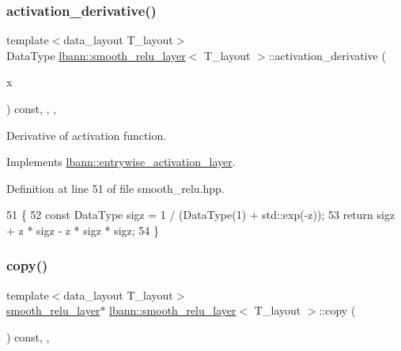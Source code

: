 \subsubsection{\texorpdfstring{activation\+\_\+derivative()}{activation\_derivative()}}
{\footnotesize\ttfamily template$<$data\+\_\+layout T\+\_\+layout$>$ \\
Data\+Type \hyperlink{classlbann_1_1smooth__relu__layer}{lbann\+::smooth\+\_\+relu\+\_\+layer}$<$ T\+\_\+layout $>$\+::activation\+\_\+derivative (\begin{DoxyParamCaption}\item[{Data\+Type}]{x }\end{DoxyParamCaption}) const\hspace{0.3cm}{\ttfamily [inline]}, {\ttfamily [override]}, {\ttfamily [protected]}, {\ttfamily [virtual]}}

Derivative of activation function. 

Implements \hyperlink{classlbann_1_1entrywise__activation__layer_a7676a4c5060452a38264993554e79f8e}{lbann\+::entrywise\+\_\+activation\+\_\+layer}.



Definition at line 51 of file smooth\+\_\+relu.\+hpp.


\begin{DoxyCode}
51                                                             \{
52     \textcolor{keyword}{const} DataType sigz = 1 / (DataType(1) + std::exp(-z));
53     \textcolor{keywordflow}{return} sigz + z * sigz - z * sigz * sigz;
54   \}
\end{DoxyCode}
\mbox{\label{classlbann_1_1smooth__relu__layer_af6fb922556c2debf7bec8d6f376dbe94}} 
\subsubsection{\texorpdfstring{copy()}{copy()}}
{\footnotesize\ttfamily template$<$data\+\_\+layout T\+\_\+layout$>$ \\
\hyperlink{classlbann_1_1smooth__relu__layer}{smooth\+\_\+relu\+\_\+layer}$\ast$ \hyperlink{classlbann_1_1smooth__relu__layer}{lbann\+::smooth\+\_\+relu\+\_\+layer}$<$ T\+\_\+layout $>$\+::copy (\begin{DoxyParamCaption}{ }\end{DoxyParamCaption}) const\hspace{0.3cm}{\ttfamily [inline]}, {\ttfamily [override]}, {\ttfamily [virtual]}}

